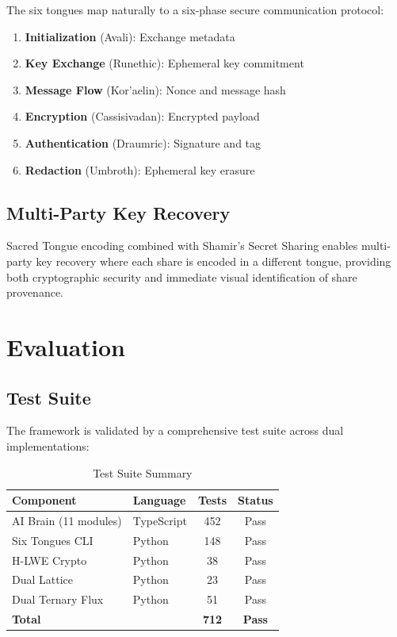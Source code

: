 \documentclass[11pt,a4paper]{article}
\begin{document}
The six tongues map naturally to a six-phase secure communication
protocol:

\begin{enumerate}
  \item \textbf{Initialization} (Avali): Exchange metadata
  \item \textbf{Key Exchange} (Runethic): Ephemeral key commitment
  \item \textbf{Message Flow} (Kor'aelin): Nonce and message hash
  \item \textbf{Encryption} (Cassisivadan): Encrypted payload
  \item \textbf{Authentication} (Draumric): Signature and tag
  \item \textbf{Redaction} (Umbroth): Ephemeral key erasure
\end{enumerate}

\subsection{Multi-Party Key Recovery}

Sacred Tongue encoding combined with Shamir's Secret Sharing enables
multi-party key recovery where each share is encoded in a different
tongue, providing both cryptographic security and immediate visual
identification of share provenance.

\section{Evaluation}
\label{sec:eval}

\subsection{Test Suite}

The framework is validated by a comprehensive test suite across
dual implementations:

\begin{table}[h]
\centering
\caption{Test Suite Summary}
\label{tab:tests}
\begin{tabular}{@{}llcc@{}}
\toprule
\textbf{Component} & \textbf{Language} & \textbf{Tests} & \textbf{Status} \\
\midrule
AI Brain (11 modules)    & TypeScript & 452 & Pass \\
Six Tongues CLI          & Python     & 148 & Pass \\
H-LWE Crypto            & Python     &  38 & Pass \\
Dual Lattice             & Python     &  23 & Pass \\
Dual Ternary Flux        & Python     &  51 & Pass \\
\midrule
\textbf{Total}           &            & \textbf{712} & \textbf{Pass} \\
\bottomrule
\end{tabular}
\end{table}
\end{document}
